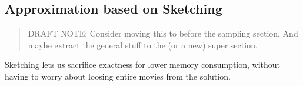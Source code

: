 \subsection*{Approximation based on Sketching}

\begin{quote}
	DRAFT NOTE: Consider moving this to before the sampling section.
	And maybe extract the general stuff to the (or a new) super section.
\end{quote}
Sketching lets us sacrifice exactness for lower memory consumption, without
having to worry about loosing entire movies from the solution.

